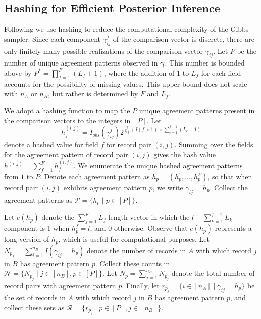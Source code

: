 \documentclass[12pt,letterpaper]{article}
\newcommand{\1}[1]{\mathbb{I}\!\left[#1\right]} %
\begin{document}
\subsection{Hashing for Efficient Posterior Inference}\label{app:hashing}
Following \cite{kundinger_2023} we use hashing to reduce the computational complexity of the Gibbs sampler. Since each component $\gamma_{ij}^f$ of the comparison vector is discrete, there are only finitely many possible realizations of the comparison vector $\gamma_{ij}$. Let $P$ be the number of unique agreement patterns observed in $\bm{\gamma}$. This number is bounded above by $P^{*} =  \prod_{f=1}^F (L_f + 1)$, where the addition of 1 to $L_f$ for each field accounts for the possibility of missing values. This upper bound does not scale with $n_A$ or $n_B$, but rather is determined by $F$ and $L_f$.  

We adopt a hashing function to map the $P$ unique agreement patterns present in the comparison vectors to the integers in $[P]$. Let
\begin{equation*}
	h_f^{(i,j)} = I_{obs}( \gamma_{ij}^f) 2^{\gamma_{ij}^f + I(f>1) \times \sum_{e=1}^{f-1}(L_{e} - 1)}
\end{equation*}
denote a hashed value for field $f$ for record pair $(i,j)$. Summing over the fields for the agreement pattern of record pair $(i,j)$ gives the hash value $h^{(i,j)}=\sum_{f=1}^Fh_f^{(i,j)}$. We enumerate the unique hashed agreement patterns from $1$ to $P$. Denote each agreement pattern as $h_p=(h_p^1,\dots,h_p^F)$, so that when record pair $(i,j)$ exhibits agreement pattern $p$, we write $\gamma_{ij}=h_p$.  Collect the agreement patterns as $\mathcal{P}=\{h_p\mid p\in[P]\}$.

Let $e(h_p)$ denote the $\sum_{f=1}^FL_f$ length vector in which the $l + \sum_{k=1}^{f-1} L_k$ component is 1 when $h_p^f = l$, and 0 otherwise. Observe that $e(h_p)$ represents a long version of $h_p$, which is useful for computational purposes. Let $N_{p_j}=\sum_{i=1}^{n_B}I(\gamma_{ij}=h_p)$ denote the number of records in $A$ with which record $j$ in $B$ has agreement pattern $p$. Collect these counts in $\mathcal{N}=\{N_{p_j}\mid j\in[n_B], p\in[P]\}.$ Let $N_p=\sum_{j=1}^{n_B}N_{p_j}$ denote the total number of record pairs with agreement pattern $p$. Finally, let $r_{p_j}=\{i\in[n_A]\mid \gamma_{ij}=h_p\}$ be the set of records in $A$ with which record $j$ in $B$ has agreement pattern $p$, and collect these sets as $\mathcal{R}=\{r_{p_j}\mid p\in[P], j\in[n_B]\}$. 
\end{document}
